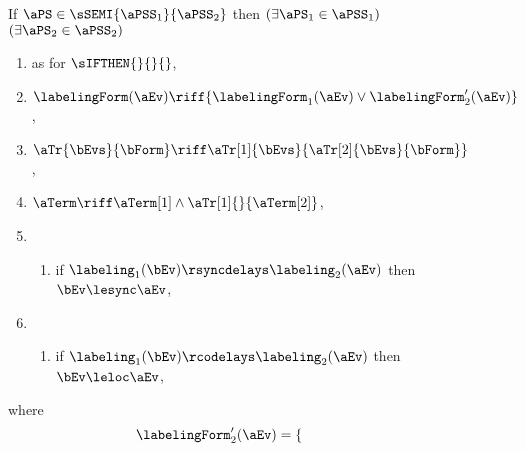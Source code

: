 \begin{figure}
  \noindent
  If $\aPS \in \sSEMI{\aPSS_1}{\aPSS_2}$ then
  $(\exists\aPS_1\in\aPSS_1)$ $(\exists\aPS_2\in\aPSS_2)$
  \begin{multicols}{2}
    \begin{enumerate}[topsep=0pt,label=(\textsc{s}\arabic*),ref=\textsc{s}\arabic*]
    \item \label{seq-E} %
      \;
      \;
      \;
      \;
      \; as for $\sIFTHEN{}{}{}$, %
      \setcounter{enumi}{\value{Bkappa}}
    \item \label{seq-kappa}
      $\labelingForm(\aEv) \riff {\labelingForm_1(\aEv)\lor\labelingForm'_2(\aEv)}$,
    \item \label{seq-tau}
      $\aTr{\bEvs}{\bForm} \riff \aTr[1]{\bEvs}{\aTr[2]{\bEvs}{\bForm}}$,
    \item \label{seq-term}
      $\aTerm \riff \aTerm[1]\land\aTr[1]{}{\aTerm[2]}$,
    \item[] \setcounter{enumi}{\value{lesync}}
      \begin{enumerate}[leftmargin=0pt]
      \item \label{seq-delay-sync}
        if $\labeling_1(\bEv)\rsyncdelays\labeling_2(\aEv)$
        then $\bEv\lesync\aEv$,
      \end{enumerate}
    \item[] \setcounter{enumi}{\value{leloc}}
      \begin{enumerate}[leftmargin=0pt]
      \item \label{seq-delay-co}
        if $\labeling_1(\bEv)\rcodelays\labeling_2(\aEv)$
        then $\bEv\leloc\aEv$,
      \end{enumerate}
    \end{enumerate}
  \end{multicols}
  where
  \begin{displaymath}
    \labelingForm'_2(\aEv)=
    \begin{cases}

\end{cases}
\end{displaymath}
\end{figure}
